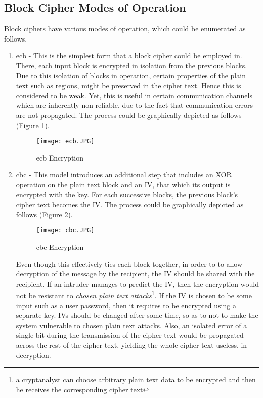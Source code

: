 \subsection{Block Cipher Modes of Operation}

Block ciphers have various modes of operation, which could be enumerated as follows.

\begin{enumerate}
    \item \acrfull{ecb} - This is the simplest form that a block cipher could be employed in. There, each input block is encrypted in isolation from the previous blocks. Due to this isolation of blocks in operation, certain properties of the plain text such as regions, might be preserved in the cipher text. Hence this is considered to be weak. Yet, this is useful in certain communication channels which are inherently non-reliable, due to the fact that communication errors are not propagated. The process could be graphically depicted as follows (Figure \ref{fig:enc_ecb}).
    
    \begin{figure}[h!]
        \texttt{[image: ecb.JPG]}
        \centering
        \caption{\acrfull{ecb} Encryption}
        \label{fig:enc_ecb}
    \end{figure}
    
    \item \acrfull{cbc} - This model introduces an additional step that includes an XOR operation on the plain text block and an IV, that which its output is encrypted with the key. For each successive blocks, the previous block's cipher text becomes the IV. The process could be graphically depicted as follows (Figure \ref{fig:enc_cbc}).
    
    \begin{figure}[h!]
        \texttt{[image: cbc.JPG]}
        \centering
        \caption{\acrfull{cbc} Encryption}
        \label{fig:enc_cbc}
    \end{figure}
    
    Even though this effectively ties each block together, in order to to allow decryption of the message by the recipient, the IV should be shared with the recipient. If an intruder manages to predict the IV, then the encryption would not be resistant to \textit{chosen plain text attacks}\footnote{a cryptanalyst can choose arbitrary plain text data to be encrypted and then he receives the corresponding cipher text}. If the IV is chosen to be some input such as a user password, then it requires to be encrypted using a separate key. IVs should be changed after some time, so as to not to make the system vulnerable to chosen plain text attacks. Also, an isolated error of a single bit during the transmission of the cipher text would be propagated across the rest of the cipher text, yielding the whole cipher text useless. in decryption.
    

\end{enumerate}
